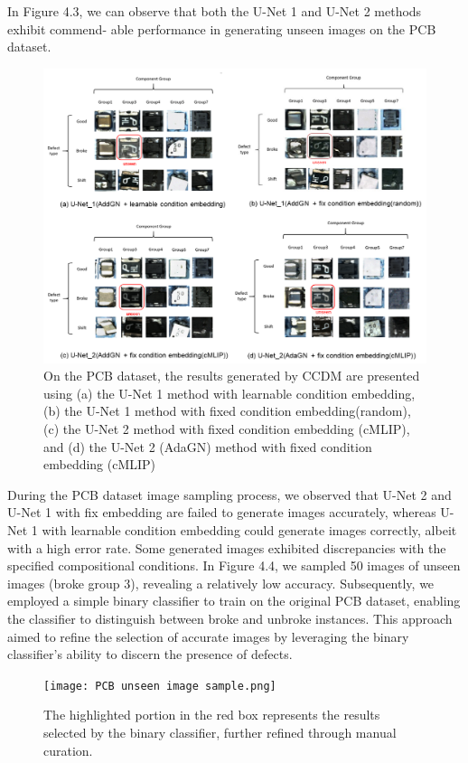 In Figure 4.3, we can observe that both the U-Net 1 and U-Net 2 methods exhibit commend-
able performance in generating unseen images on the PCB dataset.
\begin{figure}[H]
    \centering
    \includegraphics[width=1\linewidth]{PCB dataset Result.png}
    \caption{On the PCB dataset, the results generated by CCDM are presented using (a) the U-Net 1 method with learnable condition embedding, (b) the U-Net 1 method with fixed condition embedding(random), (c) the U-Net 2 method with fixed condition embedding (cMLIP), and (d) the U-Net 2 (AdaGN) method with fixed condition embedding (cMLIP)}
    \label{fig:enter-label}
\end{figure}

During the PCB dataset image sampling process, we observed that U-Net 2 and U-Net 1 with fix embedding are failed to generate images accurately, whereas U-Net 1 with learnable condition embedding could generate images correctly, albeit with a high error rate. Some generated images exhibited discrepancies with the specified compositional conditions. In Figure 4.4, we sampled 50 images of unseen images (broke group 3), revealing a relatively low accuracy. Subsequently, we employed a simple binary classifier to train on the original PCB dataset, enabling the classifier to distinguish between broke and unbroke instances. This approach aimed to refine the selection of accurate images by leveraging the binary classifier's ability to discern the presence of defects.

\begin{figure}[H]
    \centering
    \texttt{[image: PCB unseen image sample.png]}
    \caption{The highlighted portion in the red box represents the results selected by the binary classifier, further refined through manual curation.}
    \label{fig:enter-label}
\end{figure}

